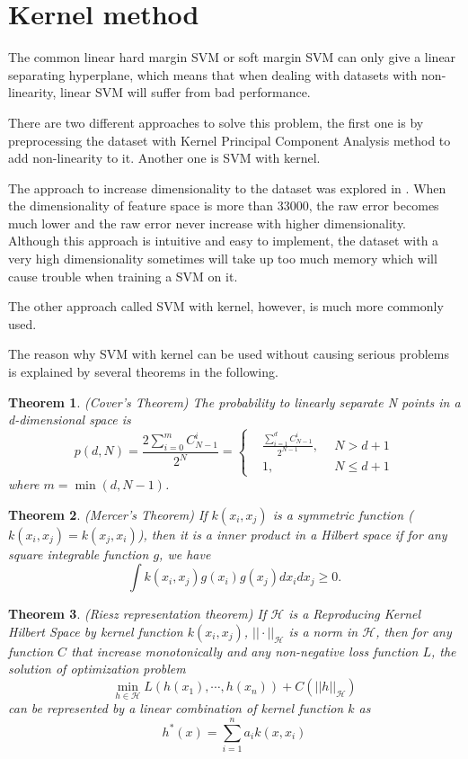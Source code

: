 \documentclass[a4paper]{report}
\newtheorem{theorem}{Theorem}[section]
\begin{document}
\section{Kernel method}

The common linear hard margin SVM or soft margin SVM can only give a linear separating hyperplane, which means that when dealing with datasets with non-linearity, linear SVM will suffer from bad performance.

There are two different approaches to solve this problem, the first one is by preprocessing the dataset with Kernel Principal Component Analysis method to add non-linearity to it. Another one is SVM with kernel.

The approach to increase dimensionality to the dataset was explored in \cite{cortes1995support}. When the dimensionality of feature space is more than 33000, the raw error becomes much lower and the raw error never increase with higher dimensionality. Although this approach is intuitive and easy to implement, the dataset with a very high dimensionality sometimes will take up too much memory which will cause trouble when training a SVM on it. 

The other approach called SVM with kernel, however, is much more commonly used.

The reason why SVM with kernel can be used without causing serious problems is explained by several theorems in the following.

\begin{theorem}
    (Cover's Theorem\cite{cover1965geometrical}) The probability to linearly separate N points in a d-dimensional space is
    \[
        p(d,N)=\frac{2\sum_{i=0}^mC_{N-1}^i}{2^N}=\left\{ 
        \begin{aligned}
            &\frac{\sum_{i=1}^dC^i_{N-1}}{2^{N-1}},\ \ &N>d+1 \\ &1,\ \ &N\le d+1
        \end{aligned} \right.
    \]
    where $m=\min(d,N-1)$.
\end{theorem}

\begin{theorem}
    (Mercer's Theorem\cite{mercer1909functions}) If $k(x_i,x_j)$ is a symmetric function ($k(x_i,x_j)=k(x_j,x_i)$), then it is a inner product in a Hilbert space if for any square integrable function $g$, we have
    \[
        \int k(x_i,x_j)g(x_i)g(x_j)dx_idx_j \geq 0.
    \]
\end{theorem}

\begin{theorem}
    (Riesz representation theorem\cite{riesz1907espèce}) If $\mathcal H$ is a Reproducing Kernel Hilbert Space by kernel function $k(x_i,x_j)$, $||\cdot||_{\mathcal H}$ is a norm in $\mathcal H$, then for any function $C$ that increase monotonically and any non-negative loss function $L$, the solution of optimization problem
    \[
        \min_{h\in\mathcal H} L(h(x_1),\cdots,h(x_n))+C(||h||_{\mathcal H})
    \]
    can be represented by a linear combination of kernel function $k$ as
    \[
        h^*(x)=\sum_{i=1}^n a_i k(x,x_i)
    \]
\end{theorem}
\end{document}
